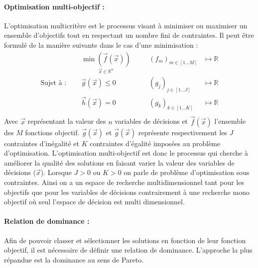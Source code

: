 \paragraph{Optimisation multi-objectif :} %
\label{par:optimisation_multi_objectif}
L’optimisation multicritère est le processus visant à minimiser ou maximiser un ensemble
d’objectifs tout en respectant un nombre fini de contraintes.
Il peut être formulé de la manière suivante dans le cas d’une minimisation :
\begin{equation}\label{eq:def_optimisation}
  \begin{aligned}
                           & \underset{\vec{x} \in \mathbb{R}^{n}}{\min(\vec{f}(\vec{x}))}& & \quad (f_{m})_{m \in [1 ... M]} & \longmapsto \mathbb{R} \\
    \text{Sujet à : }\quad & \vec{g}(\vec{x}) \leqslant 0                                 & & \quad (g_{j})_{j \in [1 ... J]} & \longmapsto \mathbb{R} \\
                           & \vec{h}(\vec{x}) = 0                                         & & \quad (g_{k})_{k \in [1 ... K]} & \longmapsto \mathbb{R} \\
  \end{aligned}
\end{equation}
Avec $\vec{x}$ représentant la valeur des $n$ variables de décisions et $\vec{f}(\vec{x})$
l’ensemble des $M$ fonctions objectif.  $\vec{g}(\vec{x})$ et $\vec{g}(\vec{x})$ représente
respectivement les $J$ contraintes d’inégalité et $K$ contraintes d’égalité imposées au problème
d’optimisation. L’optimisation multi-objectif est donc le processus qui cherche à améliorer la
qualité des solutions en faisant varier la valeur des variables de décisions ($\vec{x}$).
Lorsque $J > 0$ ou $K > 0$ on parle de problème d’optimisation sous contraintes.
Ainsi on a un espace de recherche multidimensionnel tant pour les objectifs que pour
les variables de décisions contrairement à une recherche mono objectif où seul
l’espace de décision est multi dimensionnel.

\paragraph{Relation de dominance :} %
\label{par:relation_de_dominance}
Afin de pouvoir classer et sélectionner les solutions en fonction de leur fonction
objectif, il est nécessaire de définir une relation de dominance.
L’approche la plus répandue est la dominance au sens de Pareto.

